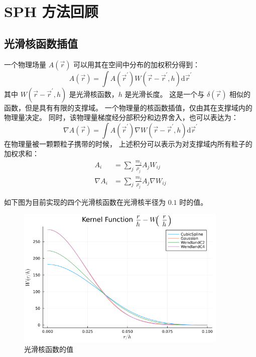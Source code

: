 \section{SPH 方法回顾}

\subsection{光滑核函数插值}

\begin{frame}
    一个物理场量 $A(\vec{r})$ 可以用其在空间中分布的加权积分得到：
    \begin{equation}
        A(\vec{r}) = \int A(\vec{r}^\prime) W(\vec{r} - \vec{r}^\prime, h) \mathrm{d} \vec{r}^\prime
    \end{equation}
    其中 $W(\vec{r} - \vec{r}^\prime, h)$ 是光滑核函数，$h$ 是光滑长度。
    这是一个与 $\delta(\vec{r})$ 相似的函数，但是具有有限的支撑域。
    一个物理量的核函数插值，仅由其在支撑域内的物理量决定。
    同时，该物理量梯度经分部积分和边界舍入，也可以表达为：
    \begin{equation}
        \nabla A(\vec{r}) = \int A(\vec{r}^\prime) \nabla W(\vec{r} - \vec{r}^\prime, h) \mathrm{d} \vec{r}^\prime
    \end{equation}
    在物理量被一颗颗粒子携带的时候，
    上述积分可以表示为对支撑域内所有粒子的加权求和：
    \begin{equation}
        \begin{aligned}
            A_i &= \sum_j \frac{m_j}{\rho_j} A_j W_{ij} \\
            \nabla A_i &= \sum_j \frac{m_j}{\rho_j} A_j \nabla W_{ij}
        \end{aligned}
    \end{equation}
\end{frame}

\begin{frame}
    如下图为目前实现的四个光滑核函数在光滑核半径为 $0.1$ 时的值。
    \begin{figure}[H]
        \centering
        \includegraphics[width=0.9\textwidth]{images/kernel_value.png}
        \caption{光滑核函数的值}
    \end{figure}
\end{frame}

